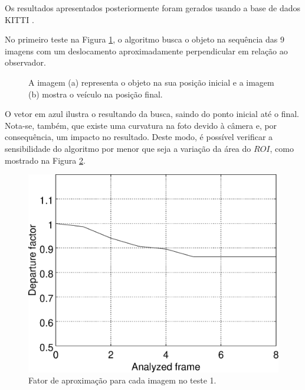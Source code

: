 
Os resultados apresentados posteriormente foram gerados usando a base de dados KITTI \cite{Geiger}.

No primeiro teste na Figura \ref{fig:imgpapercerta}, o algoritmo busca o objeto na sequência das
9 imagens com um deslocamento aproximadamente perpendicular em relação ao observador.

\begin{figure}[!hbt]
\centering
  \caption{A imagem (a) representa o objeto na sua posição inicial 
   e a imagem (b) mostra o veículo na posição final.}
  \label{fig:imgpapercerta}
\end{figure}

O vetor em azul ilustra o resultando da busca, saindo do ponto inicial até o final. 
Nota-se, também, que existe uma curvatura na foto devido à câmera e, por consequência,
um impacto no resultado. Deste modo, é possível verificar a sensibilidade do algoritmo 
por menor que seja a variação da área do $ROI$, como mostrado na Figura \ref{fig:res_graph1}.

\begin{figure}[!hbt]
\centering
\includegraphics[width=0.8\columnwidth]{images/graph1.eps}
\caption{Fator de aproximação para cada imagem no teste 1.}
\label{fig:res_graph1}
\end{figure}

